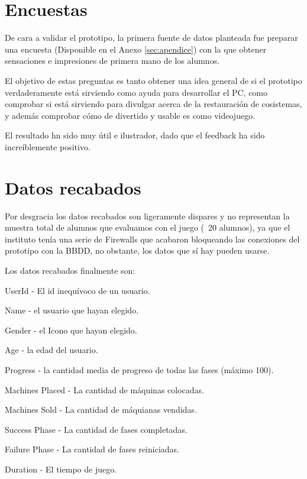 \section{Encuestas}

De cara a validar el prototipo, la primera fuente de datos planteada fue preparar una encuesta (Disponible en el Anexo \ref{sec:apendice}) con la que obtener sensaciones e impresiones de primera mano de los alumnos.

El objetivo de estas preguntas es tanto obtener una idea general de si el prototipo verdaderamente está sirviendo como ayuda para desarrollar el PC, como comprobar si está sirviendo para divulgar acerca de la restauración de cosistemas, y además comprobar cómo de divertido y usable es como videojuego.

El resultado hn sido muy útil e ilustrador, dado que el feedback ha sido increíblemente positivo. 

\section{Datos recabados}

Por desgracia los datos recabados son ligeramente dispares y no representan la muestra total de alumnos que evaluamos con el juego (~20 alumnos), ya que el instituto tenía una serie de Firewalls que acabaron bloqueando las conexiones del prototipo con la BBDD, no obstante, los datos que sí hay pueden usarse.

Los datos recabados finalmente son:

\begin{compactitem}
    \item User\textunderscore Id - El id inequívoco de un usuario.
    \item Name - el usuario que hayan elegido.
    \item Gender - el Icono que hayan elegido.
    \item Age - la edad del usuario.
    \item Progress - la cantidad media de progreso de todas las fases (máximo 100).
    \item Machines Placed - La cantidad de máquinas colocadas.
    \item Machines Sold - La cantidad de máquianas vendidas.
    \item Success Phase - La cantidad de fases completadas.
    \item Failure Phase - La cantidad de fases reiniciadas.
    \item Duration - El tiempo de juego.
\end{compactitem}

